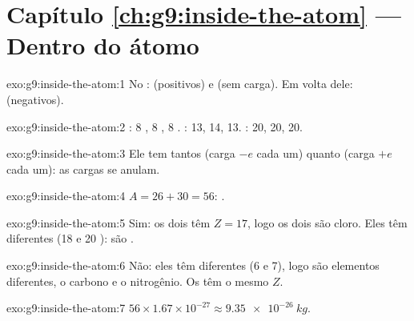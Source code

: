 \section*{Capítulo \ref{ch:g9:inside-the-atom} --- Dentro do átomo}

\begin{solution}{exo:g9:inside-the-atom:1}
No :  (positivos) e  (sem carga). Em volta dele:
 (negativos).
\end{solution}

\begin{solution}{exo:g9:inside-the-atom:2}
: 8 , 8 , 8 .
: 13, 14, 13. : 20, 20, 20.
\end{solution}

\begin{solution}{exo:g9:inside-the-atom:3}
Ele tem tantos  (carga $-e$ cada um) quanto  (carga $+e$
cada um): as cargas se anulam.
\end{solution}

\begin{solution}{exo:g9:inside-the-atom:4}
$A = 26 + 30 = 56$: .
\end{solution}

\begin{solution}{exo:g9:inside-the-atom:5}
Sim: os dois têm $Z = 17$, logo os dois são cloro. Eles têm  diferentes (18 e 20 ): são .
\end{solution}

\begin{solution}{exo:g9:inside-the-atom:6}
Não: eles têm  diferentes (6 e 7), logo são elementos
diferentes, o carbono e o nitrogênio. Os  têm o mesmo $Z$.
\end{solution}

\begin{solution}{exo:g9:inside-the-atom:7}
$56 \times 1.67 \times 10^{-27} \approx \qty{9.35e-26}{kg}$.
\end{solution}

